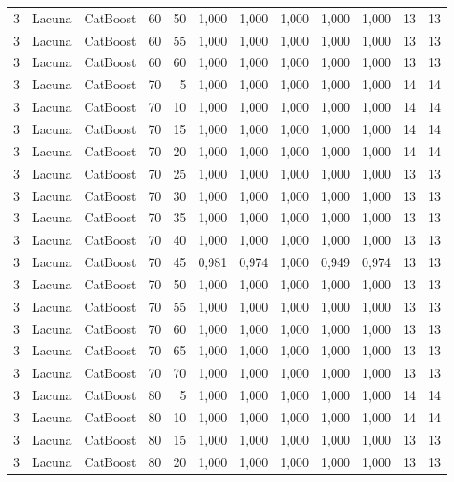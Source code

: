 \begin{longtable}{@{}rllrrrrrrrrr@{}}
3 & Lacuna & CatBoost & 60 & 50 & 1,000 & 1,000 & 1,000 & 1,000 & 1,000 & 13 & 13 \\
3 & Lacuna & CatBoost & 60 & 55 & 1,000 & 1,000 & 1,000 & 1,000 & 1,000 & 13 & 13 \\
3 & Lacuna & CatBoost & 60 & 60 & 1,000 & 1,000 & 1,000 & 1,000 & 1,000 & 13 & 13 \\
3 & Lacuna & CatBoost & 70 & 5 & 1,000 & 1,000 & 1,000 & 1,000 & 1,000 & 14 & 14 \\
3 & Lacuna & CatBoost & 70 & 10 & 1,000 & 1,000 & 1,000 & 1,000 & 1,000 & 14 & 14 \\
3 & Lacuna & CatBoost & 70 & 15 & 1,000 & 1,000 & 1,000 & 1,000 & 1,000 & 14 & 14 \\
3 & Lacuna & CatBoost & 70 & 20 & 1,000 & 1,000 & 1,000 & 1,000 & 1,000 & 14 & 14 \\
3 & Lacuna & CatBoost & 70 & 25 & 1,000 & 1,000 & 1,000 & 1,000 & 1,000 & 13 & 13 \\
3 & Lacuna & CatBoost & 70 & 30 & 1,000 & 1,000 & 1,000 & 1,000 & 1,000 & 13 & 13 \\
3 & Lacuna & CatBoost & 70 & 35 & 1,000 & 1,000 & 1,000 & 1,000 & 1,000 & 13 & 13 \\
3 & Lacuna & CatBoost & 70 & 40 & 1,000 & 1,000 & 1,000 & 1,000 & 1,000 & 13 & 13 \\
3 & Lacuna & CatBoost & 70 & 45 & 0,981 & 0,974 & 1,000 & 0,949 & 0,974 & 13 & 13 \\
3 & Lacuna & CatBoost & 70 & 50 & 1,000 & 1,000 & 1,000 & 1,000 & 1,000 & 13 & 13 \\
3 & Lacuna & CatBoost & 70 & 55 & 1,000 & 1,000 & 1,000 & 1,000 & 1,000 & 13 & 13 \\
3 & Lacuna & CatBoost & 70 & 60 & 1,000 & 1,000 & 1,000 & 1,000 & 1,000 & 13 & 13 \\
3 & Lacuna & CatBoost & 70 & 65 & 1,000 & 1,000 & 1,000 & 1,000 & 1,000 & 13 & 13 \\
3 & Lacuna & CatBoost & 70 & 70 & 1,000 & 1,000 & 1,000 & 1,000 & 1,000 & 13 & 13 \\
3 & Lacuna & CatBoost & 80 & 5 & 1,000 & 1,000 & 1,000 & 1,000 & 1,000 & 14 & 14 \\
3 & Lacuna & CatBoost & 80 & 10 & 1,000 & 1,000 & 1,000 & 1,000 & 1,000 & 14 & 14 \\
3 & Lacuna & CatBoost & 80 & 15 & 1,000 & 1,000 & 1,000 & 1,000 & 1,000 & 13 & 13 \\
3 & Lacuna & CatBoost & 80 & 20 & 1,000 & 1,000 & 1,000 & 1,000 & 1,000 & 13 & 13 \\

\end{longtable}
